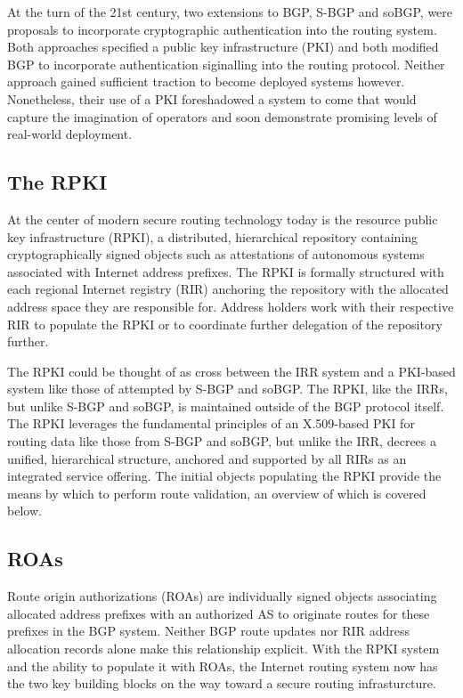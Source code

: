\documentclass[sigconf]{acmart}
\begin{document}
At the turn of the 21st century, two extensions to BGP, S-BGP and soBGP,
were proposals to incorporate cryptographic authentication into the
routing system.\cite{kent_secure_2000}\cite{white_securing_2003}  Both
approaches specified a public key infrastructure (PKI) and both modified
BGP to incorporate authentication siginalling into the routing protocol.
Neither approach gained sufficient traction to become deployed systems
however.  Nonetheless, their use of a PKI foreshadowed a system to come
that would capture the imagination of operators and soon demonstrate
promising levels of real-world deployment.

\subsection{The RPKI}

At the center of modern secure routing technology today is the resource
public key infrastructure (RPKI), a distributed, hierarchical repository
containing cryptographically signed objects such as attestations of
autonomous systems associated with Internet address
prefixes.\cite{lepinski_infrastructure_2012}  The RPKI is formally
structured with each regional Internet registry (RIR) anchoring the
repository with the allocated address space they are responsible for.
Address holders work with their respective RIR to populate the RPKI or
to coordinate further delegation of the repository further.

The RPKI could be thought of as cross between the IRR system and a
PKI-based system like those of attempted by S-BGP and soBGP.  The RPKI,
like the IRRs, but unlike S-BGP and soBGP, is maintained outside of the
BGP protocol itself.  The RPKI leverages the fundamental principles of
an X.509-based PKI for routing data like those from S-BGP and soBGP, but
unlike the IRR, decrees a unified, hierarchical structure, anchored and
supported by all RIRs as an integrated service offering.  The initial
objects populating the RPKI provide the means by which to perform route
validation, an overview of which is covered below.

\subsection{ROAs}

Route origin authorizations (ROAs) are individually signed objects
associating allocated address prefixes with an authorized AS to
originate routes for these prefixes in the BGP system.  Neither BGP
route updates nor RIR address allocation records alone make this
relationship explicit.  With the RPKI system and the ability to populate
it with ROAs, the Internet routing system now has the two key building
blocks on the way toward a secure routing infrasturcture.
\end{document}
